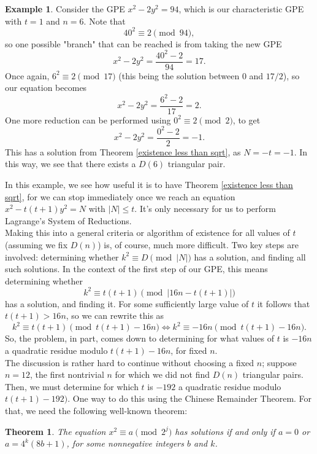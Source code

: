 \documentclass[12pt]{amsart}
\theoremstyle{theorem}
\newtheorem{theorem}{Theorem}
\theoremstyle{definition}
\newtheorem{example}{Example}
\theoremstyle{plain}
\begin{document}
\begin{example}
    Consider the GPE $x^2 - 2y^2 = 94$, which is our characteristic GPE with $t = 1$ and $n = 6$. Note that $$40^2 \equiv 2 \pmod{94},$$ so one possible "branch" that can be reached is from taking the new GPE $$x^2 - 2y^2 = \frac{40^2 - 2}{94} = 17.$$ Once again, $6^2 \equiv 2 \pmod{17}$ (this being the solution between $0$ and $17/2$), so our equation becomes $$x^2 - 2y^2 = \frac{6^2 - 2}{17} = 2.$$ One more reduction can be performed using $0^2 \equiv 2 \pmod{2}$, to get $$x^2 - 2y^2 = \frac{0^2 - 2}{2} = -1.$$ This has a solution from Theorem \ref{existence less than sqrt}, as $N = -t = -1$. In this way, we see that there exists a $D(6)$ triangular pair.
\end{example}

In this example, we see how useful it is to have Theorem \ref{existence less than sqrt}, for we can stop immediately once we reach an equation $x^2 - t(t+1)y^2 = N$ with $|N| \le t$. It's only necessary for us to perform Lagrange's System of Reductions.
\\

Making this into a general criteria or algorithm of existence for all values of $t$ (assuming we fix $D(n)$) is, of course, much more difficult. Two key steps are involved: determining whether $k^2 \equiv D \pmod{|N|}$ has a solution, and finding all such solutions. In the context of the first step of our GPE, this means determining whether $$k^2 \equiv t(t+1) \pmod{|16n - t(t+1)|}$$ has a solution, and finding it. For some sufficiently large value of $t$ it follows that $t(t+1) > 16n$, so we can rewrite this as $$k^2 \equiv t(t+1) \pmod{t(t+1) - 16n} \iff k^2 \equiv -16n \pmod{t(t+1) - 16n}.$$ So, the problem, in part, comes down to determining for what values of $t$ is $-16n$ a quadratic residue modulo $t(t+1) - 16n$, for fixed $n$.  
\\

The discussion is rather hard to continue without choosing a fixed $n$; suppose $n = 12$, the first nontrivial $n$ for which we did not find $D(n)$ triangular pairs. Then, we must determine for which $t$ is $-192$ a quadratic residue modulo $t(t+1) - 192)$. One way to do this using the Chinese Remainder Theorem. For that, we need the following well-known theorem:
\\

\begin{theorem}\label{powers of 2}
    The equation $x^2 \equiv a \pmod{2^j}$ has solutions if and only if $a = 0$ or $a = 4^k (8b+1)$, for some nonnegative integers $b$ and $k$.
\end{theorem}
\end{document}
